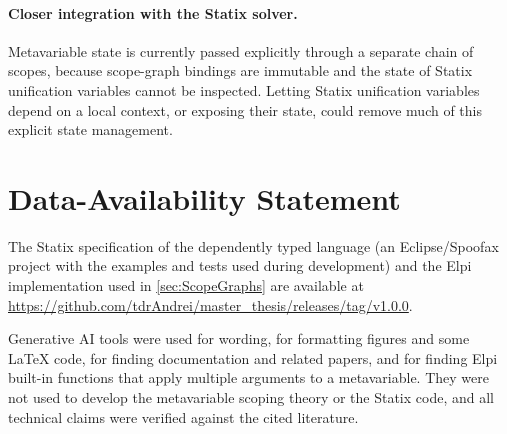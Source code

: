 \paragraph{Closer integration with the Statix solver.}
Metavariable state is currently passed explicitly through a separate chain of
scopes, because scope-graph bindings are immutable and the state of Statix
unification variables cannot be inspected. Letting Statix unification variables
depend on a local context, or exposing their state, could remove much of this
explicit state management.

\section*{Data-Availability Statement}
The Statix specification of the dependently typed language (an Eclipse/Spoofax
project with the examples and tests used during development) and the Elpi
implementation used in \cref{sec:ScopeGraphs} are available at
\url{https://github.com/tdrAndrei/master_thesis/releases/tag/v1.0.0}.

\begin{acks}
Generative AI tools were used for wording, for formatting figures and some LaTeX code, for finding documentation and related papers, and for finding Elpi built-in functions that apply multiple arguments to a metavariable. They were not used to develop the metavariable scoping theory or the Statix code, and all technical claims were verified against the cited literature.
\end{acks}
